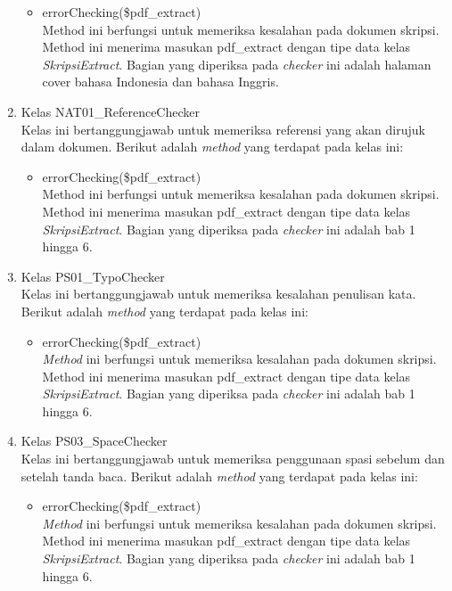 \begin{enumerate}
		\begin{itemize}
			\item errorChecking(\$pdf\_extract) \\
			Method ini berfungsi untuk memeriksa kesalahan pada dokumen skripsi. Method ini menerima masukan pdf\_extract dengan tipe data kelas \textit{SkripsiExtract}. Bagian yang diperiksa pada \textit{checker} ini adalah halaman cover bahasa Indonesia dan bahasa Inggris.
		\end{itemize}
		
	\item Kelas NAT01\_ReferenceChecker \\
	Kelas ini bertanggungjawab untuk memeriksa referensi yang akan dirujuk dalam dokumen. Berikut adalah \textit{method} yang terdapat pada kelas ini:
	
		\begin{itemize}
			\item errorChecking(\$pdf\_extract) \\
			Method ini berfungsi untuk memeriksa kesalahan pada dokumen skripsi. Method ini menerima masukan pdf\_extract dengan tipe data kelas \textit{SkripsiExtract}. Bagian yang diperiksa pada \textit{checker} ini adalah bab 1 hingga 6.
		\end{itemize}
			
	\item Kelas PS01\_TypoChecker \\
	Kelas ini bertanggungjawab untuk memeriksa kesalahan penulisan kata. Berikut adalah \textit{method} yang terdapat pada kelas ini:
	
		\begin{itemize}
			\item errorChecking(\$pdf\_extract) \\
			\textit{Method} ini berfungsi untuk memeriksa kesalahan pada dokumen skripsi. Method ini menerima masukan pdf\_extract dengan tipe data kelas \textit{SkripsiExtract}. Bagian yang diperiksa pada \textit{checker} ini adalah bab 1 hingga 6.
		\end{itemize}
			
	\item Kelas PS03\_SpaceChecker \\
	Kelas ini bertanggungjawab untuk memeriksa penggunaan spasi sebelum dan setelah tanda baca. Berikut adalah \textit{method} yang terdapat pada kelas ini:	
	
		\begin{itemize}
			\item errorChecking(\$pdf\_extract) \\
			\textit{Method} ini berfungsi untuk memeriksa kesalahan pada dokumen skripsi. Method ini menerima masukan pdf\_extract dengan tipe data kelas \textit{SkripsiExtract}. Bagian yang diperiksa pada \textit{checker} ini adalah bab 1 hingga 6.
		\end{itemize}
			

\end{enumerate}
